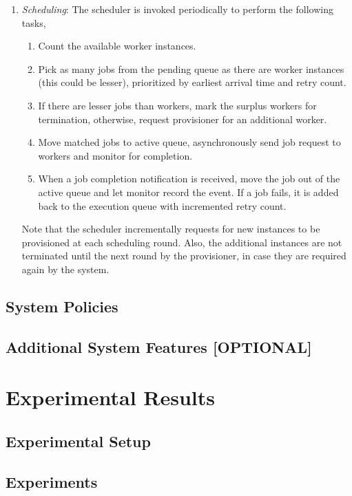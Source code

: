 \documentclass[a4paper]{IEEEtran}
\begin{document}
\begin{enumerate}
  \item \emph{Scheduling}: The scheduler is invoked periodically to perform the following tasks,
  \begin{enumerate}
    \item Count the available worker instances.
    \item Pick as many jobs from the pending queue as there are worker instances (this could be lesser), 
    prioritized by earliest arrival time and retry count.
    \item If there are lesser jobs than workers, mark the surplus workers for termination, otherwise, request
    provisioner for an additional worker.
    \item Move matched jobs to active queue, asynchronously send job request to workers and monitor for completion.
    \item When a job completion notification is received, move the job out of the active queue and let monitor record the event. If a job fails, it is added back to the execution queue with incremented retry count.
  \end{enumerate}

  Note that the scheduler incrementally requests for new instances to be provisioned at each scheduling round. Also,
  the additional instances are not terminated until the next round by the provisioner, in case they are required
  again by the system.
\end{enumerate}

\subsection{System Policies}

\subsection{Additional System Features [OPTIONAL]}

\section{Experimental Results} \label{experiments}

\subsection{Experimental Setup}

\subsection{Experiments}
\end{document}
